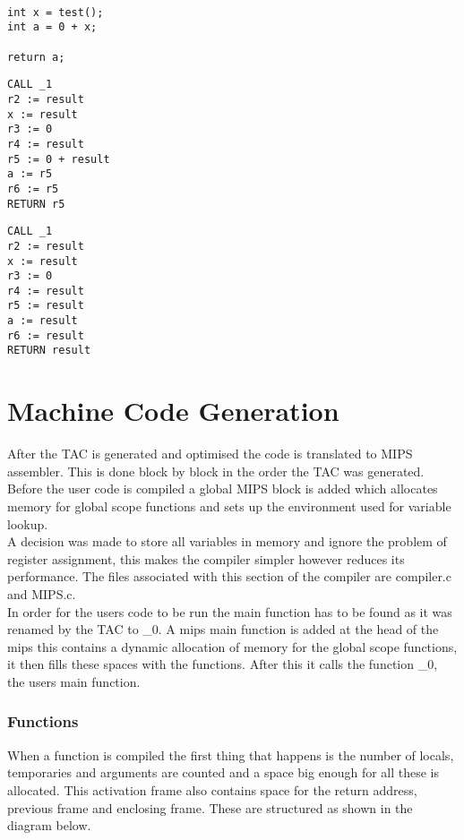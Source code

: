 \documentclass{article}
\begin{document}
\begin{minipage}{0.3\textwidth}
\begin{lstlisting}

int x = test();
int a = 0 + x;

return a;
\end{lstlisting}
\end{minipage}%
\begin{minipage}{0.3\textwidth}
\begin{lstlisting}
CALL _1
r2 := result
x := result
r3 := 0
r4 := result
r5 := 0 + result
a := r5
r6 := r5
RETURN r5
\end{lstlisting}
\end{minipage}%
\begin{minipage}{0.3\textwidth}
\begin{lstlisting}
CALL _1
r2 := result
x := result
r3 := 0
r4 := result
r5 := result
a := result
r6 := result
RETURN result
\end{lstlisting}
\end{minipage}%

\section{Machine Code Generation}

After the TAC is generated and optimised the code is translated to MIPS
assembler. This is done block by block in the order the TAC was generated.
Before the user code is compiled a global MIPS block is added which allocates memory
for global scope functions and sets up the environment used for variable lookup.\\
A decision was made to store all variables in memory and ignore the problem of register
assignment, this makes the compiler simpler however reduces its performance. The files
associated with this section of the compiler are compiler.c and MIPS.c.\\
In order for the users code to be run the main function has to be found as it
was renamed by the TAC to _0. A mips main function is added at the head of the mips
this contains a dynamic allocation of memory for the global scope functions, it then
fills these spaces with the functions. After this it calls the function _0, the users
main function.

\subsubsection{Functions}
When a function is compiled the first thing that happens is the number of locals,
temporaries and arguments are counted and a space big enough for all these is allocated.
This activation frame also contains space for the return address, previous frame
and enclosing frame. These are structured as shown in the diagram below.
\end{document}
